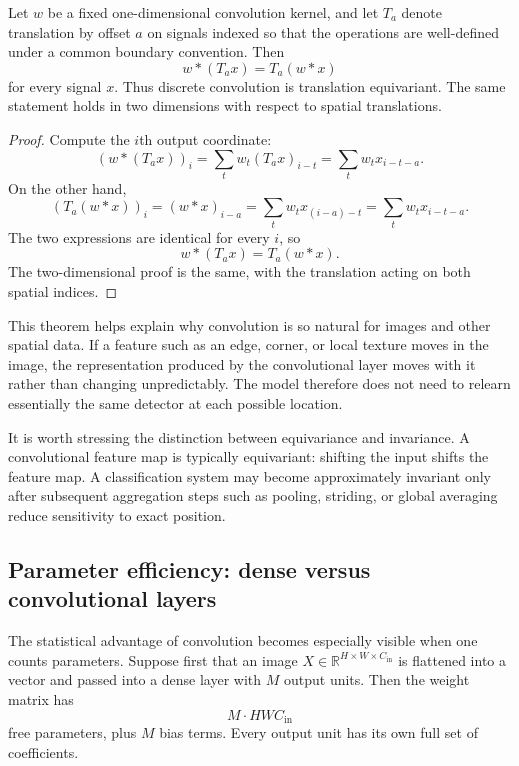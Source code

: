\begin{theorem}
Let $w$ be a fixed one-dimensional convolution kernel, and let $T_a$ denote translation by offset $a$ on signals indexed so that the operations are well-defined under a common boundary convention.
Then
\[
 w * (T_a x) = T_a (w*x)
\]
for every signal $x$.
Thus discrete convolution is translation equivariant.
The same statement holds in two dimensions with respect to spatial translations.
\end{theorem}

\begin{proof}
Compute the $i$th output coordinate:
\[
 (w*(T_a x))_i = \sum_t w_t (T_a x)_{i-t} = \sum_t w_t x_{i-t-a}.
\]
On the other hand,
\[
 (T_a(w*x))_i = (w*x)_{i-a} = \sum_t w_t x_{(i-a)-t} = \sum_t w_t x_{i-t-a}.
\]
The two expressions are identical for every $i$, so
\[
 w*(T_a x) = T_a(w*x).
\]
The two-dimensional proof is the same, with the translation acting on both spatial indices.
\end{proof}

\medskip

This theorem helps explain why convolution is so natural for images and other spatial data.
If a feature such as an edge, corner, or local texture moves in the image, the representation produced by the convolutional layer moves with it rather than changing unpredictably.
The model therefore does not need to relearn essentially the same detector at each possible location.

It is worth stressing the distinction between equivariance and invariance.
A convolutional feature map is typically equivariant: shifting the input shifts the feature map.
A classification system may become approximately invariant only after subsequent aggregation steps such as pooling, striding, or global averaging reduce sensitivity to exact position.

\subsection*{Parameter efficiency: dense versus convolutional layers}

The statistical advantage of convolution becomes especially visible when one counts parameters.
Suppose first that an image $X \in \mathbb{R}^{H \times W \times C_{\mathrm{in}}}$ is flattened into a vector and passed into a dense layer with $M$ output units.
Then the weight matrix has
\[
M \cdot HWC_{\mathrm{in}}
\]
free parameters, plus $M$ bias terms.
Every output unit has its own full set of coefficients.

